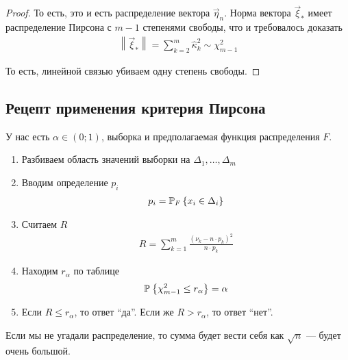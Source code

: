 \begin{proof}
  То есть, это и есть распределение вектора $\vec{\eta}_n$. Норма вектора
  $\vec{\xi}_*$ имеет распределение Пирсона с $m-1$ степенями свободы, что и
  требовалось доказать
  \begin{align*}
      \left\| \vec{\xi}_* \right\| = \sum_{k=2}^{m} \hat{\kappa}_k^2
      \sim \chi_{m-1}^2
  \end{align*}

  То есть, линейной связью убиваем одну степень свободы.
\end{proof}

\subsection{Рецепт применения критерия Пирсона}
У нас есть $\alpha \in \left( 0; 1 \right)$, выборка \xsample и
предполагаемая функция распределения $F$.

\begin{enumerate}
  \item Разбиваем область значений выборки на $\Delta_1, \dots, \Delta_m$
  \item Вводим определение $p_i$
      \begin{align*}
      p_i = \Probability[F]{x_i \in \Delta_i}
      \end{align*}
  \item Считаем $R$
      \begin{align*}
      R = \sum_{k=1}^{m}\frac{\left( \nu_k - n \cdot p_k \right)^2}{
          n \cdot p_k}
      \end{align*}
  \item Находим $r_{\alpha}$ по таблице
      \begin{align*}
      \Probability{\chi_{m-1}^2 \le r_{\alpha}} = \alpha
      \end{align*}
  \item Если $R \le r_{\alpha}$, то ответ ``да''. Если же $R > r_{\alpha}$,
      то ответ ``нет''.
\end{enumerate}

Если мы не угадали распределение, то сумма будет вести себя как $\sqrt{n}$ ---
будет очень большой.
